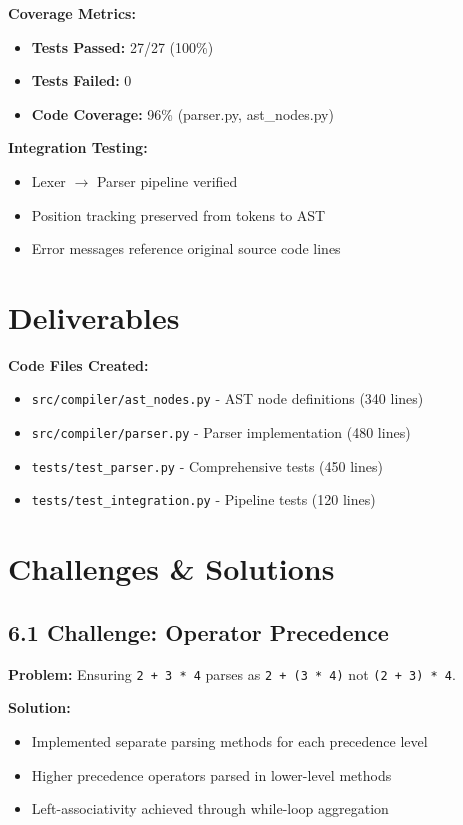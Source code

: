 \documentclass[a4paper,11pt]{article}
\begin{document}
\textbf{Coverage Metrics:}
\begin{itemize}[leftmargin=*]
    \item \textbf{Tests Passed:} 27/27 (100\%)
    \item \textbf{Tests Failed:} 0
    \item \textbf{Code Coverage:} 96\% (parser.py, ast\_nodes.py)
\end{itemize}

\textbf{Integration Testing:}
\begin{itemize}[leftmargin=*]
    \item Lexer $\rightarrow$ Parser pipeline verified
    \item Position tracking preserved from tokens to AST
    \item Error messages reference original source code lines
\end{itemize}

\section{Deliverables}

\textbf{Code Files Created:}
\begin{itemize}[leftmargin=*]
    \item \texttt{src/compiler/ast\_nodes.py} - AST node definitions (340 lines)
    \item \texttt{src/compiler/parser.py} - Parser implementation (480 lines)
    \item \texttt{tests/test\_parser.py} - Comprehensive tests (450 lines)
    \item \texttt{tests/test\_integration.py} - Pipeline tests (120 lines)
\end{itemize}

\section{Challenges \& Solutions}

\subsection{6.1 Challenge: Operator Precedence}

\textbf{Problem:} Ensuring \texttt{2 + 3 * 4} parses as \texttt{2 + (3 * 4)} not \texttt{(2 + 3) * 4}.

\textbf{Solution:}
\begin{itemize}[leftmargin=*]
    \item Implemented separate parsing methods for each precedence level
    \item Higher precedence operators parsed in lower-level methods
    \item Left-associativity achieved through while-loop aggregation
\end{itemize}
\end{document}
